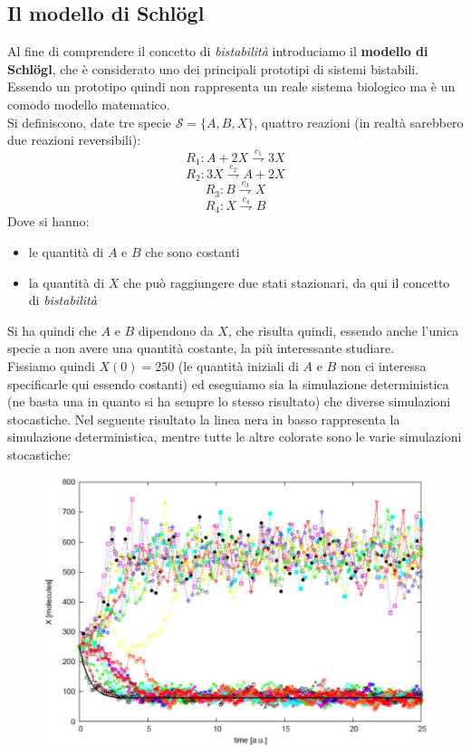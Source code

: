 \documentclass[a4paper,12pt, oneside]{book}
\begin{document}
\subsection{Il modello di Schl\"{o}gl}
Al fine di comprendere il concetto di \textit{bistabilità} introduciamo il
\textbf{modello di Schl\"{o}gl}, che è considerato uno dei principali prototipi
di sistemi bistabili. Essendo un prototipo quindi non rappresenta un reale
sistema biologico ma è un comodo modello matematico.\\
Si definiscono, date tre specie $\mathcal{S}=\{A,B,X\}$, quattro reazioni (in
realtà sarebbero due reazioni reversibili):  
\[R_1:A+2X\stackrel{c_1}{\rightharpoondown} 3X\]
\[R_2:3X\stackrel{c_2}{\rightharpoondown} A+2X\]
\[R_3:B\stackrel{c_3}{\rightharpoondown} X\]
\[R_4:X\stackrel{c_4}{\rightharpoondown} B\]
Dove si hanno:
\begin{itemize}
  \item le quantità di $A$ e $B$ che sono costanti
  \item la quantità di $X$ che può raggiungere due stati stazionari, da qui il
  concetto di \textit{bistabilità}
\end{itemize}
Si ha quindi che $A$ e $B$ dipendono da $X$, che risulta quindi, essendo anche
l'unica specie a non avere una quantità costante, la più interessante
studiare. \\
Fissiamo quindi $X(0)=250$ (le quantità iniziali di $A$ e $B$ non ci interessa
specificarle qui essendo costanti) ed eseguiamo sia la simulazione
deterministica (ne basta una in quanto si ha sempre lo stesso risultato) che
diverse simulazioni stocastiche. Nel seguente risultato la linea nera in basso
rappresenta la simulazione deterministica, mentre tutte le altre colorate sono
le varie simulazioni stocastiche:
\begin{figure}[H]
  \centering
  \includegraphics[scale = 0.3]{img/noise3.jpg}
\end{figure}
\end{document}
